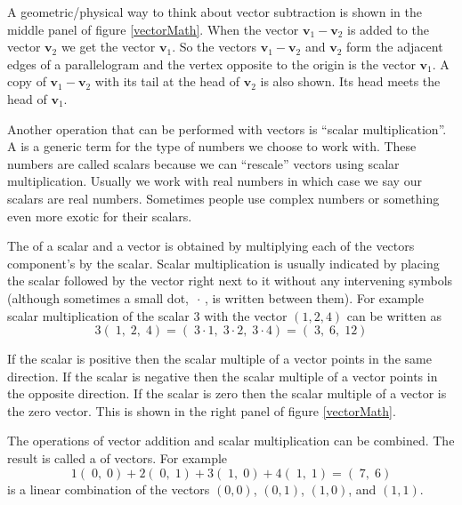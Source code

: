    A geometric/physical way to think about vector subtraction is shown in the 
middle panel of figure \ref{vectorMath}. When the vector $\mathbf{v}_1 - 
\mathbf{v}_2$ is added to the vector $\mathbf{v}_2$ we get the vector 
$\mathbf{v}_1$. So the vectors $\mathbf{v}_1 - \mathbf{v}_2$ and 
$\mathbf{v}_2$ form the adjacent edges of a parallelogram and the vertex opposite
to the origin is the vector $\mathbf{v}_1$. A copy of $\mathbf{v}_1 - 
\mathbf{v}_2$ with its tail at the head of $\mathbf{v}_2$ is also shown. Its
head meets the head of $\mathbf{v}_1$.

   Another operation that can be performed with vectors is ``scalar 
multiplication''. A  is a generic term for the type of
numbers we choose to work with. These numbers are called scalars because we 
can ``rescale'' vectors using scalar multiplication. Usually we work with real 
numbers in which case we say our scalars are real numbers. Sometimes people 
use complex numbers or something even more exotic for their scalars. 

   The  of a scalar and a vector is obtained by
multiplying each of the vectors component's by the scalar. Scalar 
multiplication is usually indicated by placing the scalar followed by the 
vector right next to it without any intervening symbols (although sometimes a 
small dot, $\, \cdot\, $, is written between them). For example scalar 
multiplication of the scalar $3$ with the vector $( 1, 2, 4)$ can be written as
\begin{equation*}
3(\; 1, \; 2, \; 4) = (\; 3 \cdot 1, \; 3 \cdot 2, \; 3 \cdot 4) 
= (\; 3,\; 6, \; 12)
\end{equation*}

   If the scalar is positive then the scalar multiple of a vector points in the 
same direction. If the scalar is negative then the scalar multiple of a vector 
points in the opposite direction. If the scalar is zero then the scalar 
multiple of a vector is the zero vector. This is shown in the right panel of 
figure \ref{vectorMath}. 

   The operations of vector addition and scalar multiplication can be combined.
The result is called a  of vectors. For example
\begin{equation*}
  1 (\; 0,\; 0) + 2 (\; 0,\; 1) + 3 (\; 1,\; 0) + 4 (\; 1,\; 1) =  (\; 7,\; 6)
\end{equation*}
is a linear combination of the vectors $(0,0)$, $(0,1)$, $(1,0)$, and $(1,1)$.

